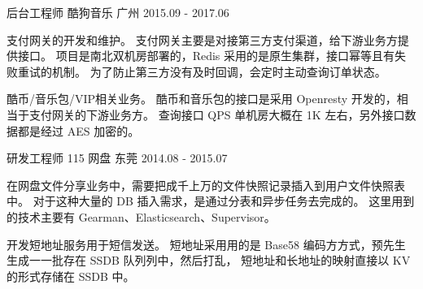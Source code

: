 \begin{cventries}
  \cventry
    {后台工程师} %
    {酷狗音乐} %
    {广州} %
    {2015.09 - 2017.06} %
    {
      \begin{cvitems} %
        \item
        {
          支付⽹关的开发和维护。
          支付网关主要是对接第三⽅⽀付渠道，给下游业务方提供接口。
          项目是南北双机房部署的，Redis 采⽤的是原生集群，接⼝幂等且有失败重试的机制。
          为了防⽌第三⽅没有及时回调，会定时主动查询订单状态。
        }
        \item
        {
          酷币/⾳乐包/VIP相关业务。
          酷币和音乐包的接口是采用 Openresty 开发的，相当于⽀付⽹关的下游业务方。
          查询接口 QPS 单机房大概在 1K 左右，另外接口数据都是经过 AES 加密的。
        }
      \end{cvitems}
    }

  \cventry
    {研发工程师} %
    {115 网盘} %
    {东莞} %
    {2014.08 - 2015.07} %
    {
      \begin{cvitems} %
        \item
        {
          在网盘⽂件分享业务中，需要把成千上万的⽂件快照记录插⼊到⽤户⽂件快照表中。
          对于这种⼤量的 DB 插⼊需求，是通过分表和异步任务去完成的。
          这⾥⽤到的技术主要有 Gearman、Elasticsearch、Supervisor。
        }
        \item
        {
          开发短地址服务用于短信发送。
          短地址采⽤用的是 Base58 编码⽅方式，预先⽣生成⼀一批存在 SSDB 队列列中，然后打乱，
          短地址和⻓地址的映射直接以 KV 的形式存储在 SSDB 中。
        }
      \end{cvitems}
    }

\end{cventries}
